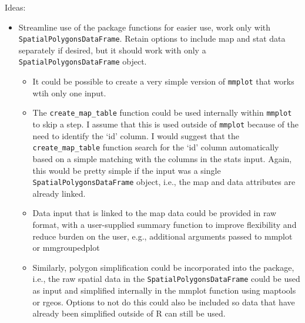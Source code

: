 \documentclass[letterpaper,12pt]{article}\usepackage[]{graphicx}\usepackage[]{color}
\begin{document}
Ideas:
\begin{itemize}
\item Streamline use of the package functions for easier use, work only with \texttt{SpatialPolygonsDataFrame}.  Retain options to include map and stat data separately if desired, but it should work with only a \texttt{SpatialPolygonsDataFrame} object.
\begin{itemize}
\item It could be possible to create a very simple version of \texttt{mmplot} that works wtih only one input.
\item The \texttt{create\_map\_table} function could be used internally within \texttt{mmplot} to skip a step.  I assume that this is used outside of \texttt{mmplot} because of the need to identify the `id' column.  I would suggest that the \texttt{create\_map\_table} function search for the `id' column automatically based on a simple matching with the columns in the stats input.  Again, this would be pretty simple if the input was a single \texttt{SpatialPolygonsDataFrame} object, i.e., the map and data attributes are already linked.
\item Data input that is linked to the map data could be provided in raw format, with a user-supplied summary function to improve flexibility and reduce burden on the user, e.g., additional arguments passed to mmplot or mmgroupedplot
\item Similarly, polygon simplification could be incorporated into the package, i.e., the raw spatial data in the \texttt{SpatialPolygonsDataFrame} could be used as input and simplified internally in the mmplot function using maptools or rgeos.  Options to not do this could also be included so data that have already been simplified outside of R can still be used.
\end{itemize}

\end{itemize}
\end{document}
